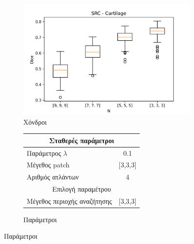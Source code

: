 \documentclass{beamer}
\begin{document}
\begin{frame}
\begin{figure}[H]
    \begin{subfigure}[b]{0.42\linewidth}
    \includegraphics[width=\linewidth]{SRC_N_Cartilage_plot.png}
    \caption{Χόνδροι}
    \end{subfigure}
    \begin{subfigure}[b]{0.42\linewidth}
        \begin{tabular}[t]{|l|c|} 
            \multicolumn{2}{c}{\footnotesize Σταθερές παράμετροι} \\
            \hline
            \footnotesize Παράμετρος $\lambda$ & \footnotesize 0.1 \\
            \hline
            \footnotesize Μέγεθος patch & \footnotesize [3,3,3] \\
            \hline
            \footnotesize Αριθμός ατλάντων & \footnotesize 4 \\ 
            \hline
            \multicolumn{2}{c}{\footnotesize Επιλογή παραμέτρου} \\
            \hline
            \footnotesize Μέγεθος περιοχής αναζήτησης & \footnotesize  [3,3,3] \\ 
            \hline
        \end{tabular}
    \caption{Παράμετροι}
    \end{subfigure}
\end{figure}

\end{frame}
\end{document}
